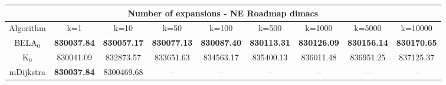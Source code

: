 \begin{tabular}{c|cccccccc}\toprule
\multicolumn{9}{c}{Number of expansions - NE Roadmap dimacs}\\ \midrule
Algorithm & k=1 & k=10 & k=50 & k=100 & k=500 & k=1000 & k=5000 & k=10000 \\ \midrule
BELA$_0$ & \textbf{830037.84} & \textbf{830057.17} & \textbf{830077.13} & \textbf{830087.40} & \textbf{830113.31} & \textbf{830126.09} & \textbf{830156.14} & \textbf{830170.65} \\
K$_0$ & 830041.09 & 832873.57 & 833651.63 & 834563.17 & 835400.13 & 836011.48 & 836951.25 & 837125.37 \\
mDijkstra & \textbf{830037.84} & 8300469.68 & -- & -- & -- & -- & -- & -- \\ \bottomrule 
\end{tabular}
